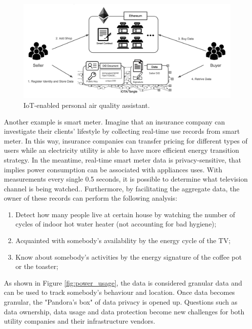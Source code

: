 \documentclass[journal,article,applsci,submit,moreauthors,pdftex]{Definitions/mdpi}
\begin{document}
\begin{figure}[h]
    \centering
    \includegraphics[width=5.5 in]{airbox}
    \caption{IoT-enabled personal air quality assistant.}
    \label{fig:airbox}
\end{figure}

Another example is smart meter. Imagine that an insurance company can investigate their clients’ lifestyle by collecting real-time use records from smart meter. In this way, insurance companies can transfer pricing for different types of users while an electricity utility is able to have more efficient energy transition strategy. In the meantime, real-time smart meter data is privacy-sensitive, that implies power consumption can be associated with appliances uses. With measurements every single 0.5 seconds, it is possible to determine what television channel is being watched.\cite{SmartGridPrivacy}. Furthermore, by facilitating the aggregate data, the owner of these records can perform the following analysis:
\begin{enumerate}[leftmargin=*,labelsep=4.9mm]
    \item Detect how many people live at certain house by watching the number of cycles of indoor hot water heater (not accounting for bad hygiene);
    \item Acquainted with somebody's availability by the energy cycle of the TV;
    \item Know about somebody's activities by the energy signature of the coffee pot or the toaster;
\end{enumerate}

As shown in Figure \ref{fig:power_usage}, the data is considered granular data and can be used to track somebody's behaviour and location. Once data becomes granular, the "Pandora's box" of data privacy is opened up. Questions such as data ownership, data usage and data protection become new challenges for both utility companies and their infrastructure vendors.
\end{document}
